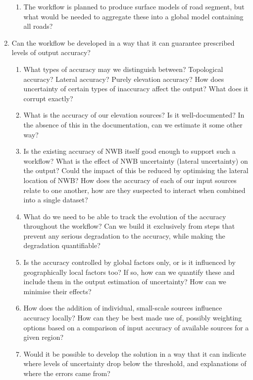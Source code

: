\begin{enumerate}
\begin{enumerate}
        \item The workflow is planned to produce surface models of road segment, but what would be needed to aggregate these into a global model containing all roads?
    \end{enumerate}
    \item Can the workflow be developed in a way that it can guarantee prescribed levels of output accuracy?
    \begin{enumerate}
        \item What types of accuracy may we distinguish between? Topological accuracy? Lateral accuracy? Purely elevation accuracy? How does uncertainty of certain types of inaccuracy affect the output? What does it corrupt exactly?
        \item What is the accuracy of our elevation sources? Is it well-documented? In the absence of this in the documentation, can we estimate it some other way?
        \item Is the existing accuracy of NWB itself good enough to support such a workflow? What is the effect of NWB uncertainty (lateral uncertainty) on the output? Could the impact of this be reduced by optimising the lateral location of NWB?
        \tiem How does the accuracy of each of our input sources relate to one another, how are they suspected to interact when combined into a single dataset?
        \item What do we need to be able to track the evolution of the accuracy throughout the workflow? Can we build it exclusively from steps that prevent any serious degradation to the accuracy, while making the degradation quantifiable?
        \item Is the accuracy controlled by global factors only, or is it influenced by geographically local factors too? If so, how can we quantify these and include them in the output estimation of uncertainty? How can we minimise their effects?
        \item How does the addition of individual, small-scale sources influence accuracy locally? How can they be best made use of, possibly weighting options based on a comparison of input accuracy of available sources for a given region?
        \item Would it be possible to develop the solution in a way that it can indicate where levels of uncertainty drop below the threshold, and explanations of where the errors came from?
        
    \end{enumerate}
\end{enumerate}